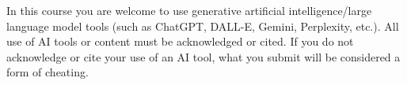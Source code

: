 In this course you are welcome to use generative artificial intelligence/large
language model tools (such as ChatGPT, DALL-E, Gemini, Perplexity, etc.). All use
of AI tools or content must be acknowledged or cited. If you do not acknowledge
or cite your use of an AI tool, what you submit will be considered a form of
cheating.

